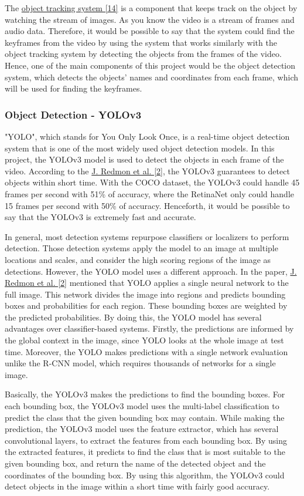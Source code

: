 \documentclass{article}
\begin{document}
The \hyperlink{ref14}{object tracking system [14]} is a component that keeps track on the object by watching the stream of images. As you know the video is a stream of frames and audio data. Therefore, it would be possible to say that the system could find the keyframes from the video by using the system that works similarly with the object tracking system by detecting the objects from the frames of the video. Hence, one of the main components of this project would be the object detection system, which detects the objects' names and coordinates from each frame, which will be used for finding the keyframes.

\subsubsection{Object Detection - YOLOv3}

"YOLO", which stands for You Only Look Once, is a real-time object detection system that is one of the most widely used object detection models. In this project, the YOLOv3 model is used to detect the objects in each frame of the video. According to the \hyperlink{ref2}{J. Redmon et al. [2]}, the YOLOv3 guarantees to detect objects within short time. With the COCO dataset, the YOLOv3 could handle 45 frames per second with 51\% of accuracy, where the RetinaNet only could handle 15 frames per second with 50\% of accuracy. Henceforth, it would be possible to say that the YOLOv3 is extremely fast and accurate.

In general, most detection systems repurpose classifiers or localizers to perform detection. Those detection systems apply the model to an image at multiple locations and scales, and consider the high scoring regions of the image as detections. However, the YOLO model uses a different approach. In the paper, \hyperlink{ref2}{J. Redmon et al. [2]} mentioned that YOLO applies a single neural network to the full image. This network divides the image into regions and predicts bounding boxes and probabilities for each region. These bounding boxes are weighted by the predicted probabilities. By doing this, the YOLO model has several advantages over classifier-based systems. Firstly, the predictions are informed by the global context in the image, since YOLO looks at the whole image at test time. Moreover, the YOLO makes predictions with a single network evaluation unlike the R-CNN model, which requires thousands of networks for a single image.

Basically, the YOLOv3 makes the predictions to find the bounding boxes. For each bounding box, the YOLOv3 model uses the multi-label classification to predict the class that the given bounding box may contain. While making the prediction, the YOLOv3 model uses the feature extractor, which has several convolutional layers, to extract the features from each bounding box. By using the extracted features, it predicts to find the class that is most suitable to the given bounding box, and return the name of the detected object and the coordinates of the bounding box. By using this algorithm, the YOLOv3 could detect objects in the image within a short time with fairly good accuracy.
\end{document}
